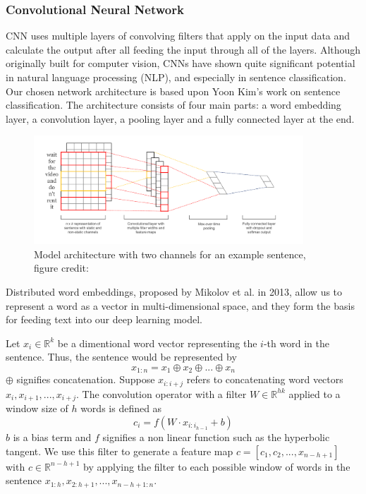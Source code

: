 \documentclass[conference]{IEEEtran}
\begin{document}
\subsubsection{Convolutional Neural Network}
\label{model:back:cnn}
    CNN uses multiple layers of convolving filters that apply on the input data and
    calculate the output after all feeding the input through all of the layers. Although
    originally built for computer vision, CNNs have shown quite significant potential in
    natural language processing (NLP), and especially in sentence classification.
    Our chosen network architecture is based upon Yoon Kim's work on sentence
    classification\cite{kim2014convolutional}. The architecture consists of four 
    main parts: a word
    embedding layer, a convolution layer, a pooling layer and a fully connected layer
    at the end.
    \begin{figure}
    \center\includegraphics[width=0.9\textwidth]{figure/sc_model}
    \caption{Model architecture with two channels for an example sentence,
     figure credit: \cite{kim2014convolutional}}
    \end{figure}

    Distributed word embeddings, proposed by Mikolov et al.
    in 2013\cite{word2vec}, allow us to represent a word as a vector in
    multi-dimensional space, and they form the basis for feeding text into our deep
    learning model.

    Let $x_{i} \in \mathbb{R}^k$ be a dimentional word vector representing the $i$-th word in the
    sentence. Thus, the sentence would be represented by
    \begin{equation}
    x_{1:n} = x_1 \oplus x_2 \oplus ... \oplus x_n
    \end{equation}
    $\oplus$ signifies concatenation. Suppose $x_{i:i+j}$ refers to concatenating
    word vectors $x_i, x_{i+1}, ... , x_{i+j}$. The convolution operator with a filter
    $W \in \mathbb{R}^{hk}$ applied to a window size of $h$
    words is defined as
    \begin{equation}
    c_i = f(W \cdot x_{i:i_{h-1}} + b)
    \end{equation}
    $b$ is a bias term and $f$ signifies a non linear function such as the hyperbolic
    tangent. We use this filter to generate a feature map $c = [c_1, c_2, ... ,x_{n-h+1}]$
    with $c \in \mathbb{R}^{n-h+1}$ by applying the filter to each possible window of words in
    the sentence $x_{1:h}, x_{2:h+1}, ... ,x_{n-h+1:n}$.
\end{document}

